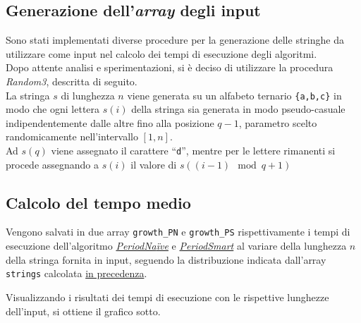 \documentclass[11pt,a4paper,italian]{article}
\begin{document}
\subsection{Generazione dell'\textit{array} degli input}
Sono stati implementati diverse procedure per la generazione delle stringhe da utilizzare come input nel calcolo dei tempi di esecuzione degli algoritmi.\\
Dopo attente analisi e sperimentazioni, si è deciso di utilizzare la procedura \textit{Random3}, descritta di seguito.\\
La stringa $s$ di lunghezza $n$ viene generata su un alfabeto ternario \texttt{\{a,b,c\}} in modo che ogni lettera $s(i)$ della stringa sia generata in modo pseudo-casuale indipendentemente dalle altre fino alla posizione $q-1$, parametro scelto randomicamente nell'intervallo $[1,n]$.\\
Ad $s(q)$ viene assegnato il carattere ``\texttt{d}'', mentre per le lettere rimanenti si procede assegnando a $s(i)$ il valore di $s( (i-1) \mod q+1 )$


\subsection{Calcolo del tempo medio}
Vengono salvati in due array \texttt{growth\_PN} e \texttt{growth\_PS} rispettivamente i tempi di esecuzione dell'algoritmo \hyperlink{section.2}{\textit{PeriodNa{\"i}ve}} e \hyperlink{section.3}{\textit{PeriodSmart}} al variare della lunghezza $n$ della stringa fornita in input, seguendo la distribuzione indicata dall'array \texttt{strings} calcolata \hyperlink{subsection.4.3}{in precedenza}.

Visualizzando i risultati dei tempi di esecuzione con le rispettive lunghezze dell'input, si ottiene il grafico sotto.
\end{document}
